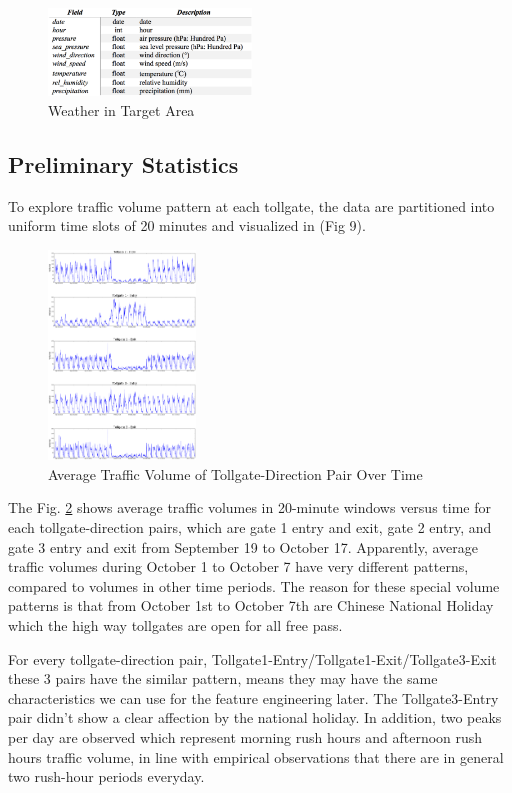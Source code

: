\documentclass[journal, letterpaper]{IEEEtran}
\begin{document}
\begin{figure} [H]
  \centering
  \includegraphics[width=0.48\textwidth]{weather.png}
  \caption{Weather in Target Area}
  \label{fig:8}
\end{figure}

\subsection{Preliminary Statistics}
To explore traffic volume pattern at each tollgate, the data are partitioned into uniform time slots of 20 minutes and visualized in (Fig 9).

\begin{figure} [H]
  \centering
  \includegraphics[width=0.35\textwidth]{tollgate-volume-3.png}
  \caption{Average Traffic Volume of Tollgate-Direction Pair Over Time}
  \captionsetup{justification=centering}
  \label{fig:9}
\end{figure}

The Fig. \ref{fig:9} shows average traffic volumes in 20-minute windows versus time for each tollgate-direction pairs, which are gate 1 entry and exit, gate 2 entry, and gate 3 entry and exit from September 19 to October 17. Apparently, average traffic volumes during October 1 to October 7 have very different patterns, compared to volumes in other time periods. The reason for these special volume patterns is that from October 1st to October 7th are Chinese National Holiday which the high way tollgates are open for all free pass. 

For every tollgate-direction pair, Tollgate1-Entry/Tollgate1-Exit/Tollgate3-Exit these 3 pairs have the similar pattern, means they may have the same characteristics we can use for the feature engineering later. The Tollgate3-Entry pair didn't show a clear affection by the national holiday. In addition, two peaks per day are observed which represent morning rush hours and afternoon rush hours traffic volume, in line with empirical observations that there are in general two rush-hour periods everyday.
\end{document}
